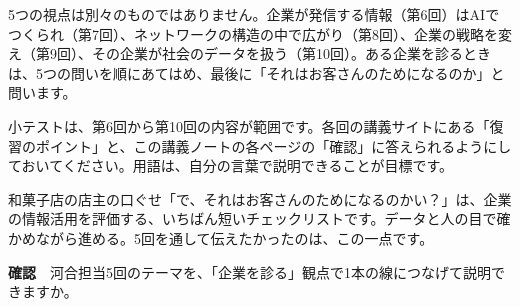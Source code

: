 \documentclass[paper=a4paper,fontsize=10pt,line_length=170mm,number_of_lines=46,baselineskip=1.6zw]{jlreq}
\newcommand\subhead[1]{\par\vspace{2.6mm}{\sffamily\bfseries\large #1}\par\vspace{1.3mm}}
\begin{document}
5つの視点は別々のものではありません。企業が発信する情報（第6回）はAIでつくられ（第7回）、ネットワークの構造の中で広がり（第8回）、企業の戦略を変え（第9回）、その企業が社会のデータを扱う（第10回）。ある企業を診るときは、5つの問いを順にあてはめ、最後に「それはお客さんのためになるのか」と問います。\par\vspace{1.2mm}
\subhead{小テストに向けて}
小テストは、第6回から第10回の内容が範囲です。各回の講義サイトにある「復習のポイント」と、この講義ノートの各ページの「確認」に答えられるようにしておいてください。用語は、自分の言葉で説明できることが目標です。\par\vspace{1.2mm}
\subhead{最後の問い}
和菓子店の店主の口ぐせ「で、それはお客さんのためになるのかい？」は、企業の情報活用を評価する、いちばん短いチェックリストです。データと人の目で確かめながら進める。5回を通して伝えたかったのは、この一点です。\par\vspace{1.2mm}
\begin{checkbox}
{\sffamily\bfseries 確認}　河合担当5回のテーマを、「企業を診る」観点で1本の線につなげて説明できますか。\par
\end{checkbox}
\end{document}
